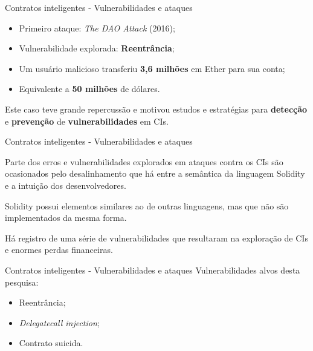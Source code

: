 \begin{frame}{Contratos inteligentes - Vulnerabilidades e ataques}
    \begin{itemize}
        \item Primeiro ataque: \textit{The DAO Attack} (2016);
        \item Vulnerabilidade explorada: \textbf{Reentrância};
        \item Um usuário malicioso transferiu \textbf{3,6 milhões} em Ether para sua conta;
        \item Equivalente a \textbf{50 milhões} de dólares.
    \end{itemize}
    \begin{block}{}
    Este caso teve grande repercussão e motivou estudos e estratégias para \textbf{detecção} e \textbf{prevenção} de \textbf{vulnerabilidades} em CIs. 
    \end{block}
\end{frame}

\begin{frame}{Contratos inteligentes - Vulnerabilidades e ataques}
    \begin{block}{}
    Parte dos erros e vulnerabilidades explorados em ataques contra os CIs são ocasionados pelo desalinhamento que há entre a semântica da linguagem Solidity e a intuição dos desenvolvedores.
    \end{block}
    \begin{block}{}
    Solidity possui elementos similares ao de outras linguagens, mas que não são implementados da mesma forma.
    \end{block}
    \begin{alertblock}{}
    Há registro de uma série de vulnerabilidades que resultaram na exploração de CIs e enormes perdas financeiras.
    \end{alertblock}
\end{frame}

\begin{frame}{Contratos inteligentes - Vulnerabilidades e ataques}
    Vulnerabilidades alvos desta pesquisa:
    \begin{itemize}
        \item Reentrância;
        \item \textit{Delegatecall injection};
        \item Contrato suicida.
    \end{itemize}
\end{frame}

